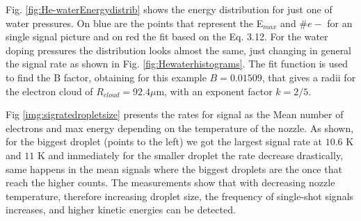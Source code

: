 Fig. \ref{fig:He-waterEnergydistrib} shows the energy distribution for just one of water pressures. On blue are the points that represent the E$_{max}$ and $\#e-$ for an single signal picture and on red the fit based on the Eq. 3.12. For the water doping pressures the distribution looks almost the same, just changing in general the signal rate as shown in Fig. \ref{fig:Hewaterhistograms}. The fit function is used to find the B factor, obtaining for this example $B=0.01509$, that gives a radii for the electron cloud of $R_{cloud}=92.4 \mu$m, with an exponent factor $k=2/5$. 

Fig \ref{img:sigratedropletsize} presents the rates for signal as the Mean number of electrons and max energy depending on the temperature of the nozzle. As shown, for the biggest droplet (points to the left) we got the largest signal rate at $10.6$ K and $11$ K and immediately for the smaller droplet the rate decrease drastically, same happens in the mean signals where the biggest droplets are the once that reach the higher counts. The measurements show that with decreasing nozzle temperature, therefore increasing droplet size, the frequency of single-shot signals increases, and higher kinetic energies can be detected.

